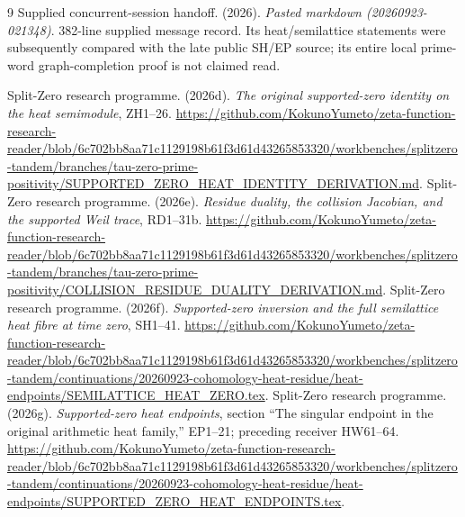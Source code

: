 \documentclass[11pt,a4paper]{article}
\theoremstyle{definition}
\begin{document}
\begin{thebibliography}{9}
Supplied concurrent-session handoff. (2026).
\emph{Pasted markdown (20260923-021348)}.
382-line supplied message record. Its heat/semilattice statements were subsequently compared with the late public SH/EP source; its entire local prime-word graph-completion proof is not claimed read.

Split-Zero research programme. (2026d).
\emph{The original supported-zero identity on the heat semimodule}, ZH1--26.
\url{https://github.com/KokunoYumeto/zeta-function-research-reader/blob/6c702bb8aa71c1129198b61f3d61d43265853320/workbenches/splitzero-tandem/branches/tau-zero-prime-positivity/SUPPORTED_ZERO_HEAT_IDENTITY_DERIVATION.md}.
Split-Zero research programme. (2026e).
\emph{Residue duality, the collision Jacobian, and the supported Weil trace}, RD1--31b.
\url{https://github.com/KokunoYumeto/zeta-function-research-reader/blob/6c702bb8aa71c1129198b61f3d61d43265853320/workbenches/splitzero-tandem/branches/tau-zero-prime-positivity/COLLISION_RESIDUE_DUALITY_DERIVATION.md}.
Split-Zero research programme. (2026f).
\emph{Supported-zero inversion and the full semilattice heat fibre at time zero}, SH1--41.
\url{https://github.com/KokunoYumeto/zeta-function-research-reader/blob/6c702bb8aa71c1129198b61f3d61d43265853320/workbenches/splitzero-tandem/continuations/20260923-cohomology-heat-residue/heat-endpoints/SEMILATTICE_HEAT_ZERO.tex}.
Split-Zero research programme. (2026g).
\emph{Supported-zero heat endpoints}, section ``The singular endpoint in the original arithmetic heat family,'' EP1--21; preceding receiver HW61--64.
\url{https://github.com/KokunoYumeto/zeta-function-research-reader/blob/6c702bb8aa71c1129198b61f3d61d43265853320/workbenches/splitzero-tandem/continuations/20260923-cohomology-heat-residue/heat-endpoints/SUPPORTED_ZERO_HEAT_ENDPOINTS.tex}.

\end{thebibliography}
\end{document}
